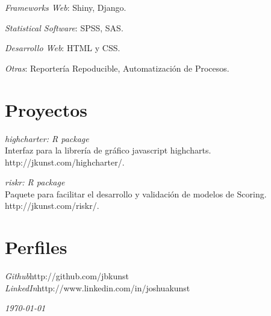 \documentclass[margin]{res}
\begin{document}
\begin{resume}
    {\sl Frameworks Web}: Shiny, Django.

    {\sl Statistical Software}: SPSS, SAS.
    
    {\sl Desarrollo Web}: HTML y CSS.
    
    {\sl Otras}: Reportería Repoducible, Automatización de Procesos.

\vspace{1cm}

\newpage

\section{Proyectos}


    {\sl highcharter: R package}\\
    Interfaz para la librería de gráfico javascript highcharts.\\
    http://jkunst.com/highcharter/.
    
    {\sl riskr: R package}\\
    Paquete para facilitar el desarrollo y validación de modelos
    de Scoring.\\
    http://jkunst.com/riskr/.

\vspace{1cm}

\section{Perfiles}
    
    {\sl Github}\hfill http://github.com/jbkunst\\
    
    {\sl LinkedIn}\hfill http://www.linkedin.com/in/joshuakunst

\vspace{1cm}


\end{resume}

\vspace{0.5cm}

\hfill {\sl \today}
\end{document}

